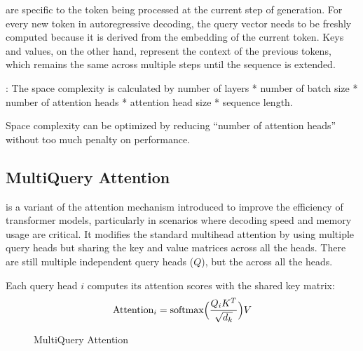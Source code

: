 \documentclass[letterpaper,11pt,english]{sphinxmanual}
\begin{document}
\sphinxAtStartPar
{}  are specific to the token being
processed at the current step of generation. For every new token in
autoregressive decoding, the query vector needs to be freshly computed
because it is derived from the embedding of the current token. Keys and
values, on the other hand, represent the context of the previous tokens,
which remains the same across multiple steps until the sequence is
extended.

\sphinxAtStartPar
{}: The space
complexity is calculated by number of layers * number of batch size * number
of attention heads * attention head size * sequence length.

\sphinxAtStartPar
Space complexity can be optimized by reducing “number of attention
heads” without too much penalty on performance.


\subsection{Multi\sphinxhyphen{}Query Attention}
\label{\detokenize{pretraining:multi-query-attention}}
\sphinxAtStartPar
{} is a variant of the attention mechanism
introduced to improve the efficiency of transformer models, particularly
in scenarios where decoding speed and memory usage are critical. It
modifies the standard multi\sphinxhyphen{}head attention by using multiple query heads
but sharing the key and value matrices across all the heads. There are
still multiple independent query heads (\(Q\)), but the  across all the
heads.

\sphinxAtStartPar
Each query head \(i\) computes its attention scores with the shared
key matrix:
\begin{equation*}
\begin{split}\text{Attention}_i = \text{softmax} \Big({Q_i K^T \over \sqrt{d_k}}\Big)V\end{split}
\end{equation*}
\begin{figure}[htbp]
\centering
\capstart

\noindent{}
\caption{Multi\sphinxhyphen{}Query Attention}\label{\detokenize{pretraining:id20}}\end{figure}
\end{document}
